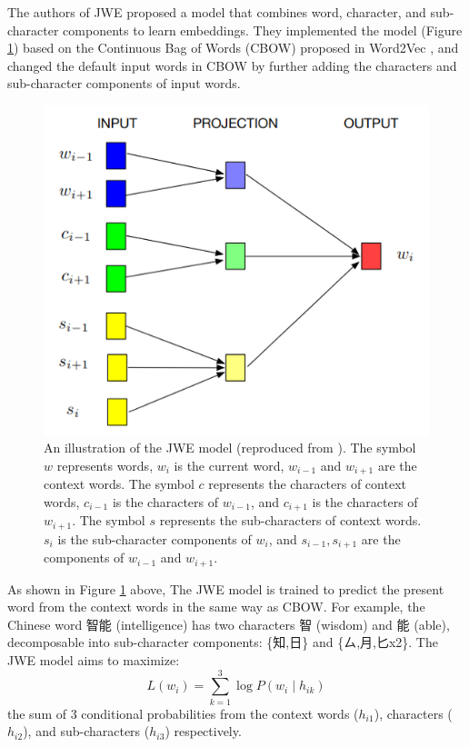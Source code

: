The authors of JWE \cite{yu2017joint} proposed a model that combines word, character, and sub-character components to learn embeddings. They implemented the model (Figure \ref{fig:jwe}) based on the Continuous Bag of Words (CBOW) proposed in Word2Vec \cite{mikolov2013efficient}, and changed the default input words in CBOW by further adding the characters and sub-character components of input words.

\begin{figure}[h]
	\centering
	\includegraphics[scale=0.7]{../images/jwe_illustration.png}
	\caption[An illustration of the JWE model (reproduced from \cite{yu2017joint})]{An illustration of the JWE model (reproduced from \cite{yu2017joint}). The symbol $w$ represents words, $w_i$ is the current word, $w_{i-1}$ and $w_{i+1}$ are the context words. The symbol $c$ represents the characters of context words, $c_{i-1}$ is the characters of $w_{i-1}$, and $c_{i+1}$ is the characters of $w_{i+1}$. The symbol $s$ represents the sub-characters of context words. $s_i$ is the sub-character components of $w_i$, and $s_{i-1}, s_{i+1}$ are the components of $w_{i-1}$ and $w_{i+1}$.}
	\label{fig:jwe}
\end{figure}

As shown in Figure \ref{fig:jwe} above, The JWE model is trained to predict the present word from the context words in the same way as CBOW. For example, the Chinese word 智能 (intelligence) has two characters 智 (wisdom) and 能 (able), decomposable into sub-character components: \{知,日\} and \{ㄙ,月,匕x2\}. The JWE model aims to maximize:
\begin{equation*}
L(w_i) = \sum_{k=1}^3\log P(w_i\mid h_{ik})
\end{equation*}
the sum of 3 conditional probabilities from the context words ($h_{i1}$), characters ($h_{i2}$), and sub-characters ($h_{i3}$) respectively.


